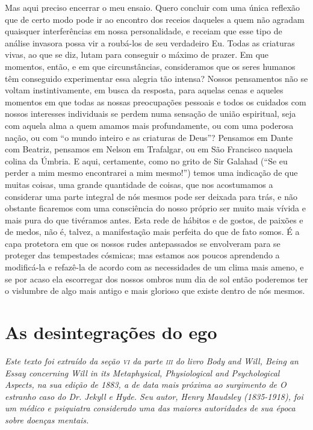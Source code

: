Mas aqui preciso encerrar o meu ensaio.  Quero concluir com uma única
reflexão que de certo modo pode ir ao encontro dos receios daqueles a
quem não agradam quaisquer interferências em nossa personalidade, e
receiam que esse tipo de análise invasora possa vir a roubá-los de seu
verdadeiro Eu.  Todas as criaturas vivas, ao que se diz, lutam para
conseguir o máximo de prazer.  Em que momentos, então, e em que
circunstâncias, consideramos que os seres humanos têm conseguido
experimentar essa alegria tão intensa? Nossos pensamentos não se voltam
instintivamente, em busca da resposta, para aquelas cenas e aqueles
momentos em que todas as nossas preocupações pessoais e todos os
cuidados com nossos interesses individuais se perdem numa sensação de
união espiritual, seja com aquela alma a quem amamos mais
profundamente, ou com uma poderosa nação, ou com “o mundo inteiro e as
criaturas de Deus”?  Pensamos em Dante com Beatriz, pensamos em Nelson
em Trafalgar, ou em São Francisco naquela colina da Úmbria. E aqui,
certamente, como no grito de Sir Galahad (“Se eu perder a mim mesmo
encontrarei a mim mesmo!”) temos uma indicação de que muitas coisas,
uma grande quantidade de coisas, que nos acostumamos a considerar uma
parte integral de nós mesmos pode ser deixada para trás, e não obstante
ficaremos com uma consciência do nosso próprio ser muito mais vívida e
mais pura do que tivéramos antes.  Esta rede de hábitos e de gostos, de
paixões e de medos, não é, talvez, a manifestação mais perfeita do que
de fato somos.  É a capa protetora em que os nossos rudes antepassados
se envolveram para se proteger das tempestades cósmicas; mas estamos
aos poucos aprendendo a modificá-la e refazê-la de acordo com as
necessidades de um clima mais ameno, e se por acaso ela escorregar dos
nossos ombros num dia de sol então poderemos ter o vislumbre de algo
mais antigo e mais glorioso que existe dentro de nós mesmos. 




\chapter[As desintegrações do ego --- Henry Maudsley]{As desintegrações do ego}

{\itshape Este texto foi extraído da seção \emph{\textsc{vi}} da parte 
\emph{\textsc{iii}} do livro \emph{Body and Will, Being an Essay concerning Will 
in its Metaphysical, Physiological and Psychological Aspects}, na 
sua edição de 1883, a de data mais próxima ao surgimento de \emph{O estranho caso 
do Dr. Jekyll e Hyde}. Seu autor, Henry Maudsley (1835-1918),
foi um médico e psiquiatra considerado uma das maiores autoridades de sua época
sobre doenças mentais.}


